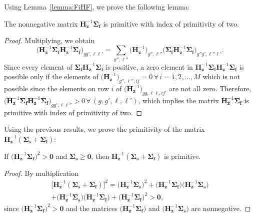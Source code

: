 Using Lemma~\ref{lemma:FiHF}, we prove the following lemma:
\begin{lemma}
	The nonnegative matrix $\mathbf{H}_{\mathbf{z}}^{-1} \mathbf{\Sigma_{f}}$ is primitive with index of primitivity of two.
\end{lemma}
\begin{proof}
	Multiplying, we obtain
	\begin{equation}
	\big ( \mathbf{H}_{\mathbf{z}}^{-1} \mathbf{\Sigma_{f}} \mathbf{H}_{\mathbf{z}}^{-1} \mathbf{\Sigma_{f}} \big )_{gg',\ell \ell'} = \sum_{g'',\ell''} \big ( \mathbf{H}_{\mathbf{z}}^{-1} \big )_{g'',\ell''} \big ( \mathbf{\Sigma_{f}}\mathbf{H}_{\mathbf{z}}^{-1}\mathbf{\Sigma_{f}} \big )_{g''g',\ell'' \ell'}.
	\end{equation}
Since every element of $\mathbf{\Sigma_{f}}\mathbf{H}_{\mathbf{z}}^{-1}\mathbf{\Sigma_{f}}$ is positive, a zero element in $\mathbf{H}_{\mathbf{z}}^{-1} \mathbf{\Sigma_{f}} \mathbf{H}_{\mathbf{z}}^{-1} \mathbf{\Sigma_{f}}$ is possible only if the elements of $\big ( \mathbf{H}_{\mathbf{z}}^{-1} \big )_{g'',\ell'',ij} = 0 \, \forall \, i = 1, 2, \dots, M$ which is not possible since the elements on row $i$ of $\big ( \mathbf{H}_{\mathbf{z}}^{-1} \big )_{gg,\ell\ell,ij'}$ are not all zero. Therefore, $\big ( \mathbf{H}_{\mathbf{z}}^{-1} \mathbf{\Sigma_{f}} \mathbf{H}_{\mathbf{z}}^{-1} \mathbf{\Sigma_{f}} \big )_{gg',\ell \ell''} > 0 \, \forall \, (g,g',\ell, \ell')$, which implies the matrix $\mathbf{H}_{\mathbf{z}}^{-1} \mathbf{\Sigma_{f}}$ is primitive with index of primitivity of two.
\end{proof}

Using the previous results, we prove the primitivity of the matrix $\mathbf{H}_{\mathbf{z}}^{-1}( \mathbf{\Sigma_{s}} + \mathbf{\Sigma_{f}} )$:
\begin{theorem}
	If $\big ( \mathbf{H}_{\mathbf{z}}^{-1} \mathbf{\Sigma_{f}} \big )^{2} > \mathbf{0}$ and $\mathbf{\Sigma_{s}} \geq \mathbf{0}$, then $\mathbf{H}_{\mathbf{z}}^{-1}( \mathbf{\Sigma_{s}} + \mathbf{\Sigma_{f}} )$ is primitive.
\end{theorem}
\begin{proof}
By multiplication
	\begin{multline}
		\big [ \mathbf{H}_{\mathbf{z}}^{-1}( \mathbf{\Sigma_{s}} + \mathbf{\Sigma_{f}} ) \big ]^{2} = \big ( \mathbf{H}_{\mathbf{z}}^{-1} \mathbf{\Sigma_{s}} \big )^{2} + \big ( \mathbf{H}_{\mathbf{z}}^{-1} \mathbf{\Sigma_{f}} \big )\big ( \mathbf{H}_{\mathbf{z}}^{-1} \mathbf{\Sigma_{s}} \big ) \\ + \big ( \mathbf{H}_{\mathbf{z}}^{-1} \mathbf{\Sigma_{s}} \big )\big ( \mathbf{H}_{\mathbf{z}}^{-1} \mathbf{\Sigma_{f}} \big ) + \big ( \mathbf{H}_{\mathbf{z}}^{-1} \mathbf{\Sigma_{f}} \big )^{2} > \mathbf{0},
	\end{multline}
	since $\big ( \mathbf{H}_{\mathbf{z}}^{-1} \mathbf{\Sigma_{f}} \big )^{2} > \mathbf{0}$ and the matrices $\big ( \mathbf{H}_{\mathbf{z}}^{-1} \mathbf{\Sigma_{f}} \big )$ and $\big ( \mathbf{H}_{\mathbf{z}}^{-1} \mathbf{\Sigma_{s}} \big )$ are nonnegative.
\end{proof}

